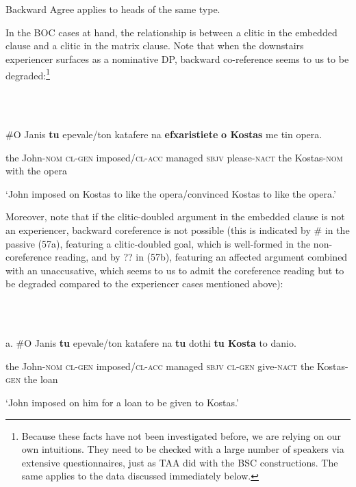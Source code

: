 \documentclass[output=paper]{langsci/langscibook}
\begin{document}
\ea%
    \label{ex:key:55}
    \gll\\
        \\
    \glt
    \z

          Backward Agree applies to heads of the same type. 

In the BOC cases at hand, the relationship is between a clitic in the embedded clause and a clitic in the matrix clause. Note that when the downstairs experiencer surfaces as a nominative DP, backward co-reference seems to us to be degraded:\footnote{Because these facts have not been investigated before, we are relying on our own intuitions. They need to be checked with a large number of speakers via extensive questionnaires, just as TAA did with the BSC constructions. The same applies to the data discussed immediately below.} 

\ea%
    \label{ex:key:56}
    \gll\\
        \\
    \glt
    \z

          \#O    Janis    \textbf{tu}  epevale/ton katafere   na   \textbf{efxaristiete}  \textbf{o  Kostas}   me tin     opera.

the John{}-\textsc{nom  cl-gen}  imposed/\textsc{cl-acc} managed \textsc{sbjv} please-\textsc{nact}   the Kostas{}-\textsc{nom} with the opera

  ‘John imposed on Kostas to like the opera/convinced Kostas to like the opera.’

Moreover, note that if the clitic-doubled argument in the embedded clause is not an experiencer, backward coreference is not possible (this is indicated by \# in the passive (57a), featuring a clitic-doubled goal, which is well-formed in the non-coreference reading, and by ?? in (57b), featuring an affected argument combined with an unaccusative, which seems to us to admit the coreference reading but to be degraded compared to the experiencer cases mentioned above):

\ea%
    \label{ex:key:57}
    \gll\\
        \\
    \glt
    \z

          a.  \#O    Janis    \textbf{tu}  epevale/ton katafere       na   \textbf{tu} dothi \textbf{tu  Kosta}         to danio.

the John{}-\textsc{nom} \textsc{cl-gen} imposed/\textsc{cl-acc} managed \textsc{sbjv cl-gen} give-\textsc{nact} the Kostas{}-\textsc{gen} the loan

    ‘John imposed on him for a loan to be given to Kostas.’
\end{document}
